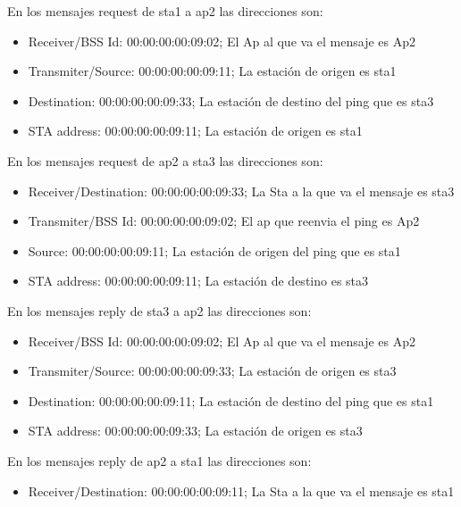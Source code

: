 \documentclass[12pt, a4paper]{report}
\begin{document}
\begin{enumerate}
\begin{enumerate}[label=\alph*)]
		En los mensajes request de sta1 a ap2 las direcciones son:
		\begin{itemize}
			\item Receiver/BSS Id: 00:00:00:00:09:02; El Ap al que va el mensaje es Ap2\\
			\item Transmiter/Source: 00:00:00:00:09:11; La estación de origen es sta1\\
			\item Destination: 00:00:00:00:09:33; La estación de destino del ping que es sta3\\
			\item STA address: 00:00:00:00:09:11; La estación de origen es sta1\\
		\end{itemize}
		En los mensajes request de ap2 a sta3 las direcciones son:
		\begin{itemize}
			\item Receiver/Destination: 00:00:00:00:09:33; La Sta a la que va el mensaje es sta3\\
			\item Transmiter/BSS Id: 00:00:00:00:09:02; El ap que reenvia el ping es Ap2\\
			\item Source: 00:00:00:00:09:11; La estación de origen del ping que es sta1\\
			\item STA address: 00:00:00:00:09:11; La estación de destino es sta3\\
		\end{itemize}
		En los mensajes reply de sta3 a ap2 las direcciones son:
		\begin{itemize}
			\item Receiver/BSS Id: 00:00:00:00:09:02; El Ap al que va el mensaje es Ap2\\
			\item Transmiter/Source: 00:00:00:00:09:33; La estación de origen es sta3\\
			\item Destination: 00:00:00:00:09:11; La estación de destino del ping que es sta1\\
			\item STA address: 00:00:00:00:09:33; La estación de origen es sta3\\
		\end{itemize}
		En los mensajes reply de ap2 a sta1 las direcciones son:
		\begin{itemize}
			\item Receiver/Destination: 00:00:00:00:09:11; La Sta a la que va el mensaje es sta1\\

\end{itemize}
\end{enumerate}
\end{enumerate}
\end{document}
